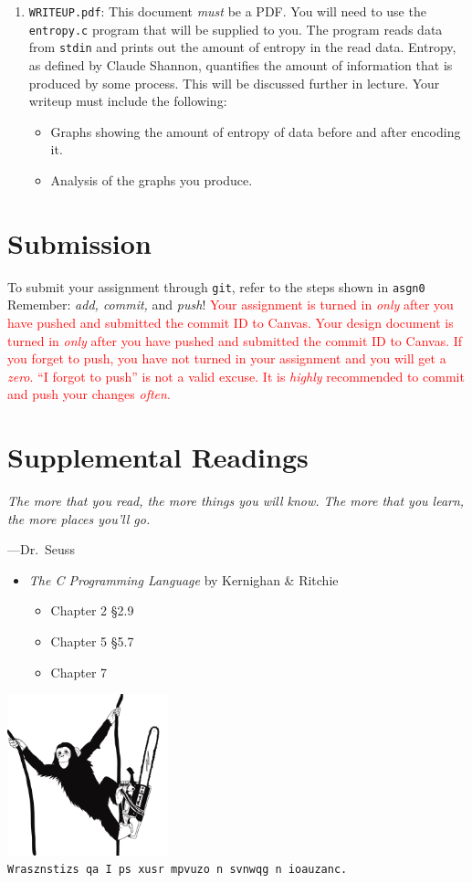 \documentclass[11pt]{article}
\begin{document}
\begin{enumerate}
  \item \texttt{WRITEUP.pdf}: This document \emph{must} be a PDF. You
    will need to use the \texttt{entropy.c} program that will be
    supplied to you. The program reads data from \texttt{stdin} and
    prints out the amount of entropy in the read data. Entropy, as
    defined by Claude Shannon, quantifies the amount of information that
    is produced by some process. This will be discussed further in
    lecture. Your writeup must include the following:
    \begin{itemize}
      \item Graphs showing the amount of entropy of data before and
        after encoding it.
      \item Analysis of the graphs you produce.
    \end{itemize}
\end{enumerate}


\section{Submission}

To submit your assignment through \texttt{git}, refer to the steps shown in
\texttt{asgn0} Remember: \emph{add, commit,} and \emph{push}!
\textcolor{red}{Your assignment is turned in \emph{only} after you have pushed
and submitted the commit ID to Canvas. Your design document is turned in \emph{only}
after you have pushed and submitted the commit ID to Canvas.
If you forget to push, you have not turned in your assignment and you will get a
\emph{zero}. ``I forgot to push'' is not a valid excuse. It is \emph{highly}
recommended to commit and push your changes \emph{often}.}


\section{Supplemental Readings}

\epigraph{\emph{The more that you read, the more things you will know. The
more that you learn, the more places you'll go.}}{---Dr.\ Seuss}

\begin{itemize}
  \item \textit{The C Programming Language} by Kernighan \& Ritchie
  \begin{itemize}
    \item Chapter 2 \S 2.9
    \item Chapter 5 \S 5.7
    \item Chapter 7
  \end{itemize}
\end{itemize}

\begin{center}
  \includegraphics[width=0.35\textwidth]{../../images/monkey-chainsaw.jpg} \\
  \vspace{10pt}
  \texttt{Wrasznstizs qa I ps xusr mpvuzo n svnwqg n ioauzanc.}
\end{center}
\end{document}
